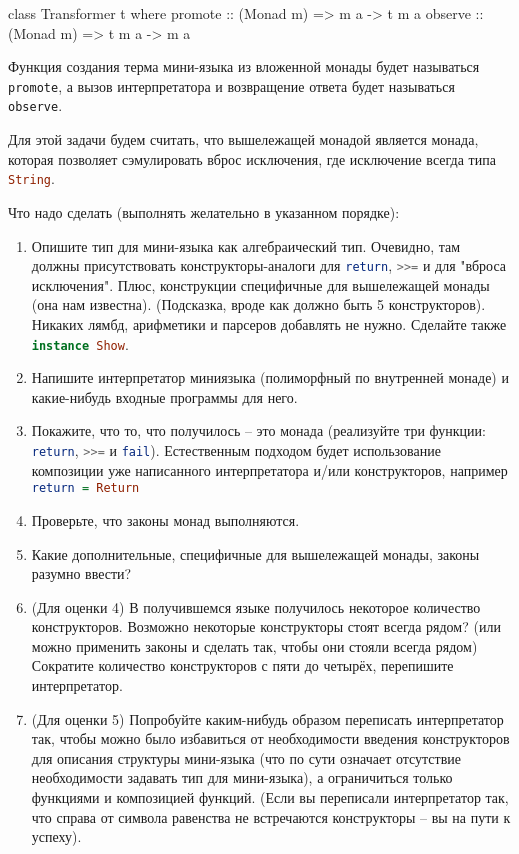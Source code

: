 \documentclass[a4paper,14pt]{article}
\def\hsinline{\lstinline[language=haskell]}
\begin{document}
\begin{hslisting}
class Transformer t where
  promote :: (Monad m) => m a -> t m a  
  observe :: (Monad m) => t m a -> m a 
\end{hslisting}
Функция создания терма мини-языка из вложенной монады будет называться \hsinline=promote=, а вызов интерпретатора и возвращение ответа будет называться \hsinline=observe=.

Для этой задачи будем считать, что вышележащей монадой является монада, которая позволяет сэмулировать вброс исключения, где исключение всегда типа \hsinline=String=.

Что надо сделать (выполнять желательно в указанном порядке):

\begin{enumerate}
 \item Опишите тип для мини-языка как алгебраический тип. Очевидно, там должны присутствовать конструкторы-аналоги для \hsinline=return=, \hsinline!>>=! и для "вброса исключения". Плюс, конструкции специфичные для вышележащей монады (она нам известна). (Подсказка, вроде как должно быть 5 конструкторов). Никаких лямбд, арифметики и парсеров добавлять не нужно. Сделайте также \hsinline=instance Show=.
 \item Напишите интерпретатор миниязыка (полиморфный по внутренней монаде) и какие-нибудь входные программы для него. 
 \item Покажите, что то, что получилось -- это монада (реализуйте три функции: \hsinline=return=, \hsinline!>>=! и \hsinline=fail=). Естественным подходом будет использование композиции уже написанного интерпретатора и/или конструкторов, например \hsinline!return = Return!
 \item Проверьте, что законы монад выполняются.
 \item Какие дополнительные, специфичные для вышележащей монады, законы разумно ввести? 
 \item (Для оценки 4) В получившемся языке получилось некоторое количество конструкторов. Возможно некоторые конструкторы стоят всегда рядом? (или можно применить законы и сделать так, чтобы они стояли всегда рядом) Сократите количество конструкторов с пяти до четырёх, перепишите интерпретатор.
%  
 \item (Для оценки 5) Попробуйте каким-нибудь образом переписать интерпретатор так, чтобы можно было избавиться от необходимости введения конструкторов для описания структуры мини-языка (что по сути означает отсутствие необходимости задавать тип для мини-языка), а ограничиться только функциями и композицией функций. (Если вы переписали интерпретатор так, что справа от символа равенства не встречаются конструкторы -- вы на пути к успеху).
 
\end{enumerate}
\end{document}
